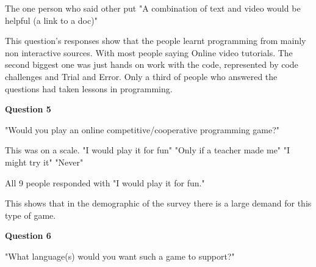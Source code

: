 \documentclass[12pt]{article}
\begin{document}

The one person who said other put "A combination of text and video would be helpful (a link to a doc)"

This question's responses show that the people learnt programming from mainly non interactive sources. With most people saying Online video tutorials. The second biggest one was just hands on work with the code, represented by code challenges and Trial and Error. Only a third of people who answered the questions had taken lessons in programming.


\textbf{Question 5}

"Would you play an online competitive/cooperative programming game?"

This was on a scale.\newline
"I would play it for fun"\newline
"Only if a teacher made me"\newline
"I might try it"\newline
"Never"

All 9 people responded with "I would play it for fun."

This shows that in the demographic of the survey there is a large demand for this type of game.


\textbf{Question 6}

"What language(s) would you want such a game to support?"
\end{document}
